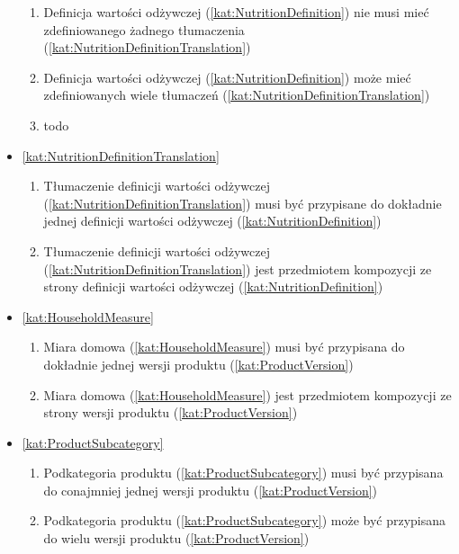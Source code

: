 \begin{itemize}[label={\textbf{Reguły dla}}, wide, labelwidth=!, labelindent=0pt]
\begin{enumerate}[label={\textbf{REG/\protect\threedigits{\arabic{enumi}}}}, wide, labelwidth=!, align=left, leftmargin=3cm, resume]
        \item Definicja wartości odżywczej (\ref{kat:NutritionDefinition}) nie musi mieć zdefiniowanego żadnego tłumaczenia (\ref{kat:NutritionDefinitionTranslation})
        \item Definicja wartości odżywczej (\ref{kat:NutritionDefinition}) może mieć zdefiniowanych wiele tłumaczeń (\ref{kat:NutritionDefinitionTranslation})
        \item todo
    \end{enumerate}
    \item\ref{kat:NutritionDefinitionTranslation}
    \begin{enumerate}[label={\textbf{REG/\protect\threedigits{\arabic{enumi}}}}, wide, labelwidth=!, align=left, leftmargin=3cm, resume]
        \item Tłumaczenie definicji wartości odżywczej (\ref{kat:NutritionDefinitionTranslation}) musi być przypisane do dokładnie jednej definicji wartości odżywczej  (\ref{kat:NutritionDefinition})
        \item Tłumaczenie definicji wartości odżywczej (\ref{kat:NutritionDefinitionTranslation}) jest przedmiotem kompozycji ze strony definicji wartości odżywczej (\ref{kat:NutritionDefinition})
    \end{enumerate}
    \item\ref{kat:HouseholdMeasure}
    \begin{enumerate}[label={\textbf{REG/\protect\threedigits{\arabic{enumi}}}}, wide, labelwidth=!, align=left, leftmargin=3cm, resume]
        \item Miara domowa (\ref{kat:HouseholdMeasure}) musi być przypisana do dokładnie jednej wersji produktu (\ref{kat:ProductVersion})
        \item Miara domowa (\ref{kat:HouseholdMeasure}) jest przedmiotem kompozycji ze strony wersji produktu (\ref{kat:ProductVersion})
    \end{enumerate}
    \item\ref{kat:ProductSubcategory}
    \begin{enumerate}[label={\textbf{REG/\protect\threedigits{\arabic{enumi}}}}, wide, labelwidth=!, align=left, leftmargin=3cm, resume]
        \item Podkategoria produktu (\ref{kat:ProductSubcategory}) musi być przypisana do conajmniej jednej wersji produktu (\ref{kat:ProductVersion})
        \item Podkategoria produktu (\ref{kat:ProductSubcategory}) może być przypisana do wielu wersji produktu (\ref{kat:ProductVersion})

\end{enumerate}
\end{itemize}
